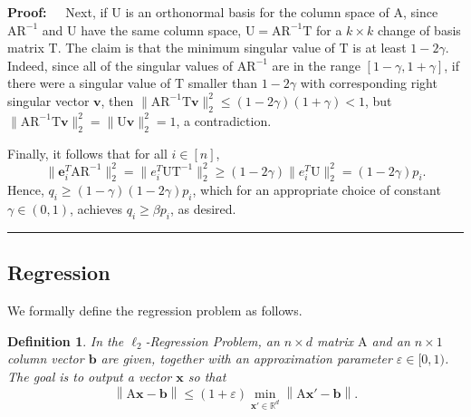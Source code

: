 \documentclass[11pt]{article}
\newtheorem{definition}[theorem]{Definition}
\newenvironment{proof}{\begin{trivlist} \item {\bf Proof:~~}}
  {\qed\end{trivlist}}
\newcommand{\mat}[1]{{\ensuremath{\bm{\mathrm{#1}}}}}
\def\b{{\mathbf b}}
\def\e{{\mathbf e}}
\def\ve{{\mathbf v}}
\def\matA{\mat{A}}
\def\matR{\mat{R}}
\def\matT{\mat{T}}
\def\matU{\mat{U}}
\def\qed{\hfill\rule{2mm}{2mm}}
\def\x{{\mathbf x}}
\def\b{{\mathbf b}}
\def\norm#1{{\left\|#1\right\|}}
\newcommand{\eps}{\varepsilon}
\begin{document}
\begin{proof}
Next, if $\matU$ is an orthonormal basis for the column space of $\matA$, since $\matA\matR^{-1}$ and $\matU$ have the same column
space, $\matU = \matA\matR^{-1}\matT$ for a $k \times k$ change of basis matrix $\matT$. The claim is that the minimum singular
value of $\matT$ is at least $1-2\gamma$. Indeed, since all of the singular values of $\matA\matR^{-1}$ are in 
the range $[1-\gamma, 1+\gamma]$, if there were a singular value of $\matT$ smaller than $1-2\gamma$ with corresponding right singular
vector $\ve$, then $\|\matA \matR^{-1} \matT \ve\|_2^2 \leq (1-2\gamma)(1+\gamma) < 1$, but $\|\matA \matR^{-1} \matT \ve\|_2^2 = \|\matU \ve\|_2^2
= 1$, a contradiction. 

Finally, it follows that for all $i \in [n]$, 
$$\|\e_i^T\matA\matR^{-1}\|_2^2 = \|e_i^T\matU\matT^{-1}\|_2^2 \geq (1-2\gamma)\|e_i^T\matU\|_2^2 = (1-2\gamma)p_i.$$
Hence, $q_i \geq (1-\gamma)(1-2\gamma)p_i$, which for an appropriate choice of constant $\gamma \in (0,1)$, achieves
$q_i \geq \beta p_i$, as desired. 
\end{proof}


\subsection{Regression}\label{sec:regression}
We formally define the regression problem as follows. 
\begin{definition}\label{prob:regression}
In the {\it $\ell_2$-Regression Problem}, an $n \times d$ matrix $\matA$ and an 
$n \times 1$ column vector $\b$ are given, together with an approximation parameter $\eps \in [0,1)$.  
The goal is to output a vector $\x$ so that
$$\norm{\matA\x-\b} \leq (1+\eps)\min_{\x' \in \mathbb{R}^d}\norm{\matA\x'-\b}.$$
\end{definition}
\end{document}
